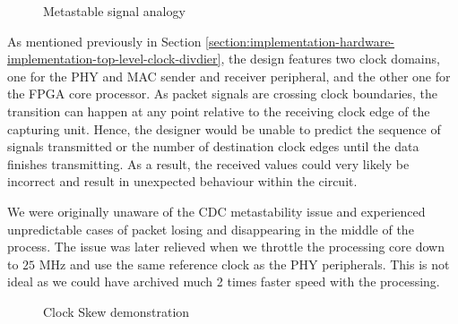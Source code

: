 \documentclass[a4paper]{report}
\begin{document}
\begin{figure}[h!]
  \caption{Metastable signal analogy \cite{stephenson-2009}}
  \label{fig:metastability-analogy}
\end{figure}

As mentioned previously in Section \ref{section:implementation-hardware-implementation-top-level-clock-divdier}, the design features two clock domains, one for the PHY and MAC sender and receiver peripheral, and the other one for the FPGA core processor. As packet signals are crossing clock boundaries, the transition can happen at any point relative to the receiving clock edge of the capturing unit. Hence, the designer would be unable to predict the sequence of signals transmitted or the number of destination clock edges until the data finishes transmitting. As a result, the received values could very likely be incorrect and result in unexpected behaviour within the circuit. 
 
We were originally unaware of the CDC metastability issue and experienced unpredictable cases of packet losing and disappearing in the middle of the process. The issue was later relieved when we throttle the processing core down to $25$ MHz and use the same reference clock as the PHY peripherals. This is not ideal as we could have archived much 2 times faster speed with the processing.

\begin{figure}[h!]
  \caption{Clock Skew demonstration \cite{arar-2018}}
  \label{fig:clock-skew}
\end{figure}
\end{document}

